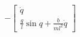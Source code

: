 \documentclass[preview]{standalone}
\begin{document}
\begin{align*}
-\begin{bmatrix}\dot{q} \\ \frac{g}{l}\sin{q}+\frac{b}{ml^2}\dot{q}\end{bmatrix}
\end{align*}
\end{document}
